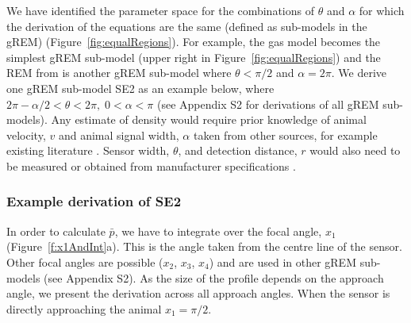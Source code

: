 \begin{knitrout}\footnotesize
{}\color{fgcolor}\begin{kframe}


{\ttfamily\noindent\bfseries\color{errorcolor}{\#\# Error in grid.Call(L\_textBounds, as.graphicsAnnot(x\$label), x\$x, x\$y, : failed to find or load PDF CID font}}\end{kframe}
\end{knitrout}


We have identified the parameter space for the combinations of $\theta$ and $\alpha$ for which the derivation of the equations are the same (defined as sub-models in the gREM) (Figure~\ref{fig:equalRegions}).
For example, the gas model becomes the simplest gREM sub-model (upper right in Figure~\ref{fig:equalRegions}) and the REM from \cite{rowcliffe2008estimating} is another gREM sub-model where $\theta<\pi/2$ and $\alpha = 2\pi$.
We derive one gREM sub-model SE2 as an example below, where $2 \pi - \alpha/2 < \theta < 2\pi ,\; 0 < \alpha <\pi$ (see Appendix S2 for derivations of all gREM sub-models).
Any estimate of density would require prior knowledge of animal velocity, $v$ and animal signal width, $\alpha$ taken from other sources, for example existing literature \cite{brinklov2011, carbone2005far}.
Sensor width, $\theta$, and detection distance, $r$ would also need to be measured or obtained from manufacturer specifications \cite{holderied2003echolocation, adams2012you}.


\subsubsection{Example derivation of SE2}

In order to calculate $\bar{p}$, we have to integrate over the focal angle, $x_1$ (Figure~\ref{f:x1AndInt}a).
This is the angle taken from the centre line of the sensor.
Other focal angles are possible ($x_2$, $x_3$, $x_4$) and are used in other gREM sub-models (see Appendix S2).
As the size of the profile depends on the approach angle, we present the derivation across all approach angles.
When the sensor is directly approaching the animal $x_1  = \pi/2$.

